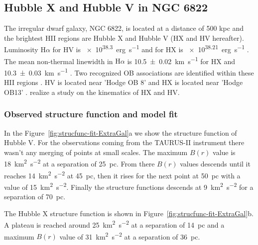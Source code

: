 \documentclass[fleqn,usenatbib, useAMS, a4paper]{mnras}
\newcommand\pos{\ensuremath{_{\mathrm{pos}}}}
\newcommand\ha{\ensuremath{\text{H}\alpha}}
\begin{document}
\subsection{Hubble X and Hubble V in NGC 6822}
\label{sec:6822-hubble}
%
The irregular dwarf galaxy, NGC 6822, is located at a distance of 500 kpc \citetext{\SI{1}{\arcsecond} = \SI{2.42}{pc} ; \citealp{2012A&A...540A.135S}} and the brightest HII regions are Hubble X and Hubble V (HX and HV hereafter). %
Luminosity \ha{} for HV is \SI{e38.3}{erg.s^{-1}} and for HX is \SI{e38.21}{erg.s^{-1}} \citep{2002MNRAS.329..481B}.
The mean non-thermal linewidth in \ha{} is \SI{10.5 \pm 0.02}{km.s^{-1}} for HX and \SI{10.3 \pm 0.03}{km.s^{-1}} \citep{1986A&A...160..374H}.
Two recognized OB associations are identified within these HII regions \citep{1991ApJ...379..621H,1992AJ....104.1374W}.
HV is located near 'Hodge OB 8' and HX is located near 'Hodge OB13'  \citep{1999PASP..111.1382O}.
\citet{1993PASJ...45..693T} realize a study on the kinematics of HX and HV. 

\subsubsection{Observed structure function and model fit}
\label{sec:observ-struct-funct-hubbles}

In the Figure~\ref{fig:strucfunc-fit-ExtraGal}a we show the structure function of Hubble V.
For the observations coming from the TAURUS-II instrument there wasn't any merging of points at small scales.
The maximum \(B(r)\) value is \SI{18}{km^{2}.s^{-2}} at a separation of \SI{25}{pc}. 
From there \(B(r)\) values descends until it reaches \SI{14}{km^{2}.s^{-2}} at \SI{45}{pc}, then it rises for the next point at \SI{50}{pc} with a value of \SI{15}{km^{2}.s^{-2}}.
Finally the structure functions descends at \SI{9}{km^{2}.s^{-2}} for a separation of \SI{70}{pc}.

The Hubble X structure function is shown in Figure~\ref{fig:strucfunc-fit-ExtraGal}b.
A plateau is reached around \SI{25}{km^{2}.s^{-2}} at a separation of \SI{14}{pc} and a maximum \(B(r)\) value of \SI{31}{km^{2}.s^{-2}} at a separation of \SI{36}{pc}.
\end{document}
